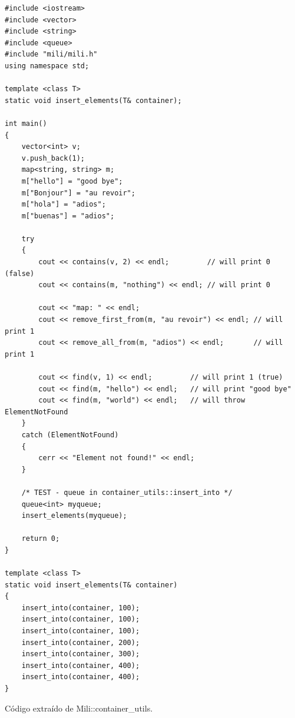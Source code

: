         		\begin{table}[!htb]
        	\lstset{language=C++}
        	\begin{lstlisting}[frame=single]
#include <iostream>
#include <vector>
#include <string>
#include <queue>
#include "mili/mili.h"
using namespace std;

template <class T>
static void insert_elements(T& container);

int main()
{
    vector<int> v;
    v.push_back(1);
    map<string, string> m;
    m["hello"] = "good bye";
    m["Bonjour"] = "au revoir";
    m["hola"] = "adios";
    m["buenas"] = "adios";

    try
    {
        cout << contains(v, 2) << endl;         // will print 0 (false)
        cout << contains(m, "nothing") << endl; // will print 0

        cout << "map: " << endl;
        cout << remove_first_from(m, "au revoir") << endl; // will print 1
        cout << remove_all_from(m, "adios") << endl;  	   // will print 1

        cout << find(v, 1) << endl;         // will print 1 (true)
        cout << find(m, "hello") << endl;   // will print "good bye"
        cout << find(m, "world") << endl;   // will throw ElementNotFound
    }
    catch (ElementNotFound)
    {
        cerr << "Element not found!" << endl;
    }

    /* TEST - queue in container_utils::insert_into */
    queue<int> myqueue;
    insert_elements(myqueue);

    return 0;
}

template <class T>
static void insert_elements(T& container)
{
    insert_into(container, 100);
    insert_into(container, 100);
    insert_into(container, 100);
    insert_into(container, 200);
    insert_into(container, 300);
    insert_into(container, 400);
    insert_into(container, 400);
}
        	\end{lstlisting}
        	\centering \caption{C\'odigo extra\'ido de Mili::container\_utils.} 
        	\label{cointailerUtils}
        \end{table}

